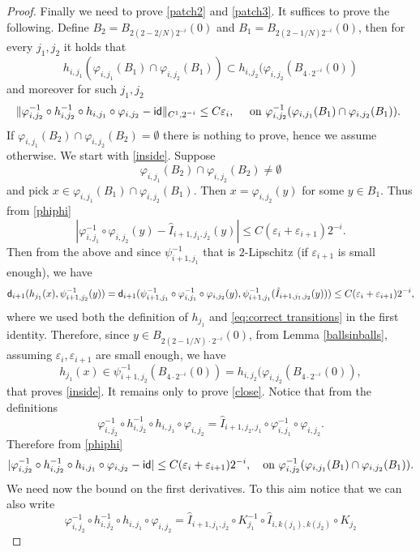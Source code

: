 \documentclass[11pt]{article}
\newcommand{\eps}{\varepsilon}
\newcommand{\sfd}{{\sf d}}
\renewcommand{\phi}{\varphi}
\theoremstyle{plain}
\theoremstyle{definition}
\numberwithin{equation}{section}
\begin{document}
\begin{proof}
	Finally we need to prove \eqref{patch2} and \eqref{patch3}. It suffices to prove the following. Define $B_2=B_{2(2-2/N) 2^{-i}}(0)$ and $B_1=B_{2(2-1/N) 2^{-i}}(0)$, then for every $j_1,j_2$  it holds that
	\begin{equation}\label{inside}
		h_{i,j_1}(\phi_{i,j_1}(B_1)\cap\phi_{i,j_2}(B_1))\subset h_{i,j_2}(\phi_{i,j_2}(B_{4 \cdot2^{-i}}(0))
	\end{equation}
	and moreover for such $j_1,j_2$ 
	\begin{equation}\label{close}
		\|\phi_{i,j_2}^{-1}\circ h_{i,j_2}^{-1}\circ h_{i,j_1}\circ \phi_{i,j_2}-{\sf{id}}\|_{C^1,2^{-i}}\le C\eps_i, \quad \text{ on   $\phi_{i,j_2}^{-1}( \phi_{i,j_1}(B_1)\cap\phi_{i,j_2}(B_1))$.	}
	\end{equation}
 If  $ \phi_{i,j_1}(B_2)\cap\phi_{i,j_2}(B_2) =\emptyset $ there is nothing to prove, hence we assume otherwise.
 We start with \eqref{inside}.	
	Suppose $$\phi_{i,j_1}(B_2)\cap\phi_{i,j_2}(B_2)\neq \emptyset$$ and pick $x\in \phi_{i,j_1}(B_1)\cap\phi_{i,j_2}(B_1)$.  Then $x=\phi_{i,j_2}(y)$ for some $y \in B_1$. Thus from \eqref{phiphi}
	\[ |\phi_{i,j_1}^{-1}\circ \phi_{i,j_2}(y)-\hat I_{i+1,j_1,j_2}(y)|\le C(\eps_i+\eps_{i+1})2^{-i}.\]
	Then from the above and since $\psi_{i+1,j_1}^{-1}$ that is  $2$-Lipschitz (if $\eps_{i+1}$ is small enough), we have 
	\[ \sfd_{i+1}(h_{j_1}(x),\psi_{i+1,j_2}^{-1}(y))=\sfd_{i+1}(\psi_{i+1,j_1}^{-1}\circ \phi_{i,j_1}^{-1}\circ \phi_{i,j_2}(y),\psi_{i+1,j_1}^{-1}(\hat I_{i+1,j_1,j_2}(y)))\le C(\eps_i+\eps_{i+1})2^{-i},\]
 where we used both the definition of $h_{j_1}$ and \eqref{eq:correct transitions} in the first identity.
	Therefore, since $y \in B_{2(2-1/N)\cdot 2^{-i}}(0)$, from Lemma \ref{ballsinballs}, assuming $\eps_i,\eps_{i+1}$ are small enough, we have 
	$$h_{j_1}(x)\in \psi_{i+1,j_2}^{-1}(B_{4	\cdot 2^{-i}}(0))=h_{i,j_2}(\phi_{i,j_2}(B_{4	\cdot 2^{-i}}(0)),$$
	that proves \eqref{inside}. It remains only to prove \eqref{close}.
	Notice that from the definitions
	$$\phi_{i,j_2}^{-1}\circ h_{i,j_2}^{-1}\circ h_{i,j_1}\circ \phi_{i,j_2}=\hat I_{i+1,j_2,j_1}\circ \phi_{i,j_1}^{-1}\circ \phi_{i,j_2}.$$ Therefore from \eqref{phiphi} 
	\[|\phi_{i,j_2}^{-1}\circ h_{i,j_2}^{-1}\circ h_{i,j_1}\circ \phi_{i,j_2}-{\sf{id}}|\le C(\eps_i+\eps_{i+1})2^{-i},
 \text{\quad on $\phi_{i,j_2}^{-1}( \phi_{i,j_1}(B_1)\cap\phi_{i,j_2}(B_1))$.}
 \]
	We need now the bound on the first derivatives. To this aim notice that we can also write 
	$$\phi_{i,j_2}^{-1}\circ h_{i,j_2}^{-1}\circ h_{i,j_1}\circ \phi_{i,j_2}=\hat I_{i+1,j_1,j_2}\circ K_{j_1}^{-1}\circ \hat I_{i,k(j_1),k(j_2)}\circ K_{j_2}$$

\end{proof}
\end{document}
